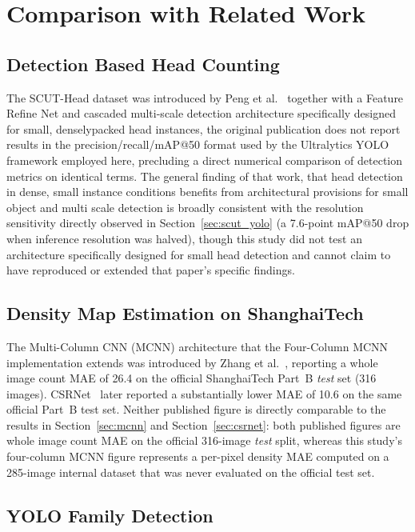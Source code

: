 \section{Comparison with Related Work}
\label{sec:related_work}

\subsection{Detection Based Head Counting}

The SCUT-Head dataset was introduced by Peng et al.~\cite{peng2018scuthead} together with a Feature Refine Net and cascaded multi-scale detection architecture specifically designed for small, denselypacked head instances, the original publication does not report results in the precision/recall/mAP@50 format used by the Ultralytics YOLO framework employed here, precluding a direct numerical comparison of detection metrics on identical terms. The general finding of that work, that head detection in dense, small instance conditions benefits from architectural provisions for small object and multi scale detection is broadly consistent with the resolution sensitivity directly observed in Section~\ref{sec:scut_yolo} (a 7.6-point mAP@50 drop when inference resolution was halved), though this study did not test an architecture specifically designed for small head detection and cannot claim to have reproduced or extended that paper's specific findings.

\subsection{Density Map Estimation on ShanghaiTech}

The Multi-Column CNN (MCNN) architecture that the Four-Column MCNN implementation extends was introduced by Zhang et al.~\cite{Zhang2016}, reporting a whole image count MAE of 26.4 on the official ShanghaiTech Part~B \emph{test} set (316 images). CSRNet~\cite{li2018csrnet} later reported a substantially lower MAE of 10.6 on the same official Part~B test set. Neither published figure is directly comparable to the results in Section~\ref{sec:mcnn} and Section~\ref{sec:csrnet}: both published figures are whole image count MAE on the official 316-image \emph{test} split, whereas this study’s four-column MCNN figure represents a per-pixel density MAE computed on a 285-image internal dataset that was never evaluated on the official test set.

\subsection{YOLO Family Detection}

